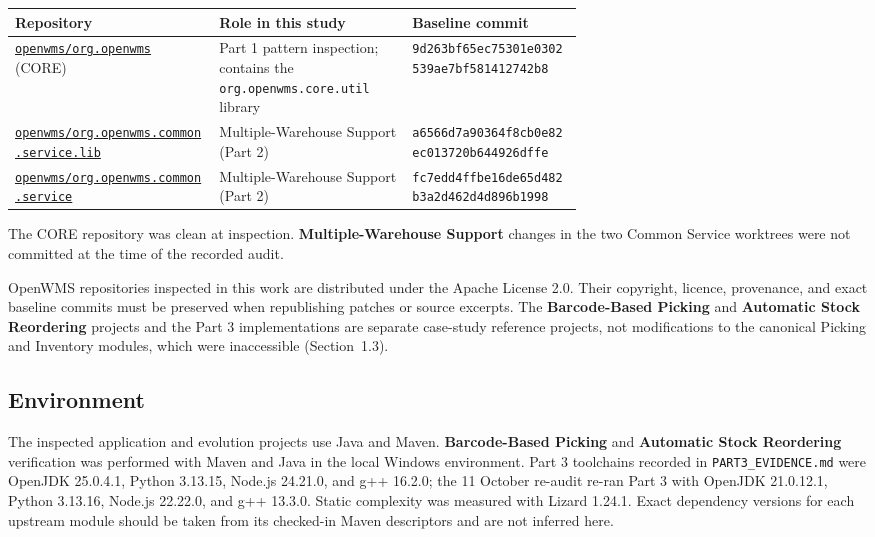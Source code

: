\documentclass[11pt,a4paper]{article}
\newcommand{\code}[1]{\nolinkurl{#1}}
\begin{document}
\begin{tabularx}{\linewidth}{@{}P{0.36\linewidth}YP{0.30\linewidth}@{}}
\toprule
Repository & Role in this study & Baseline commit\\
\midrule
\href{https://github.com/openwms/org.openwms}{\nolinkurl{openwms/org.openwms}} (CORE) & Part 1 pattern inspection; contains the \code{org.openwms.core.util} library & \code{9d263bf65ec75301e0302539ae7bf581412742b8}\\
\href{https://github.com/openwms/org.openwms.common.service.lib}{\nolinkurl{openwms/org.openwms.common.service.lib}} & Multiple-Warehouse Support (Part 2) & \code{a6566d7a90364f8cb0e82ec013720b644926dffe}\\
\href{https://github.com/openwms/org.openwms.common.service}{\nolinkurl{openwms/org.openwms.common.service}} & Multiple-Warehouse Support (Part 2) & \code{fc7edd4ffbe16de65d482b3a2d462d4d896b1998}\\
\bottomrule
\end{tabularx}

The CORE repository was clean at inspection. \textbf{Multiple-Warehouse Support} changes in the two Common Service worktrees were not committed at the time of the recorded audit.

OpenWMS repositories inspected in this work are distributed under the Apache License 2.0. Their copyright, licence, provenance, and exact baseline commits must be preserved when republishing patches or source excerpts. The \textbf{Barcode-Based Picking} and \textbf{Automatic Stock Reordering} projects and the Part 3 implementations are separate case-study reference projects, not modifications to the canonical Picking and Inventory modules, which were inaccessible (Section~1.3).

\subsection{Environment}
The inspected application and evolution projects use Java and Maven. \textbf{Barcode-Based Picking} and \textbf{Automatic Stock Reordering} verification was performed with Maven and Java in the local Windows environment. Part 3 toolchains recorded in \code{PART3_EVIDENCE.md} were OpenJDK 25.0.4.1, Python 3.13.15, Node.js 24.21.0, and g++ 16.2.0; the 11 October re-audit re-ran Part 3 with OpenJDK 21.0.12.1, Python 3.13.16, Node.js 22.22.0, and g++ 13.3.0. Static complexity was measured with Lizard 1.24.1. Exact dependency versions for each upstream module should be taken from its checked-in Maven descriptors and are not inferred here.
\end{document}
